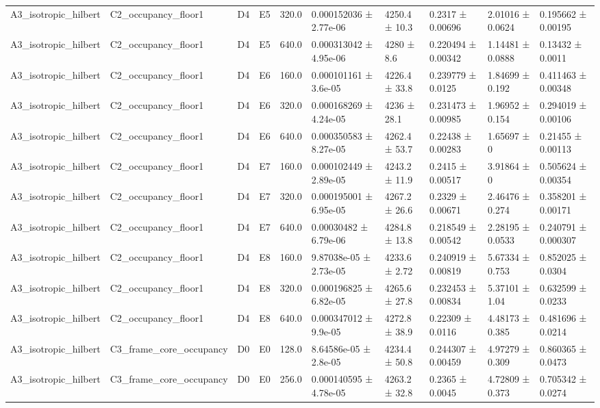 \begin{table}
\begin{tabular}{llllllllll}
A3\_isotropic\_hilbert & C2\_occupancy\_floor1 & D4 & E5 & 320.0 & 0.000152036 ± 2.77e-06 & 4250.4 ± 10.3 & 0.2317 ± 0.00696 & 2.01016 ± 0.0624 & 0.195662 ± 0.00195 \\
A3\_isotropic\_hilbert & C2\_occupancy\_floor1 & D4 & E5 & 640.0 & 0.000313042 ± 4.95e-06 & 4280 ± 8.6 & 0.220494 ± 0.00342 & 1.14481 ± 0.0888 & 0.13432 ± 0.0011 \\
A3\_isotropic\_hilbert & C2\_occupancy\_floor1 & D4 & E6 & 160.0 & 0.000101161 ± 3.6e-05 & 4226.4 ± 33.8 & 0.239779 ± 0.0125 & 1.84699 ± 0.192 & 0.411463 ± 0.00348 \\
A3\_isotropic\_hilbert & C2\_occupancy\_floor1 & D4 & E6 & 320.0 & 0.000168269 ± 4.24e-05 & 4236 ± 28.1 & 0.231473 ± 0.00985 & 1.96952 ± 0.154 & 0.294019 ± 0.00106 \\
A3\_isotropic\_hilbert & C2\_occupancy\_floor1 & D4 & E6 & 640.0 & 0.000350583 ± 8.27e-05 & 4262.4 ± 53.7 & 0.22438 ± 0.00283 & 1.65697 ± 0 & 0.21455 ± 0.00113 \\
A3\_isotropic\_hilbert & C2\_occupancy\_floor1 & D4 & E7 & 160.0 & 0.000102449 ± 2.89e-05 & 4243.2 ± 11.9 & 0.2415 ± 0.00517 & 3.91864 ± 0 & 0.505624 ± 0.00354 \\
A3\_isotropic\_hilbert & C2\_occupancy\_floor1 & D4 & E7 & 320.0 & 0.000195001 ± 6.95e-05 & 4267.2 ± 26.6 & 0.2329 ± 0.00671 & 2.46476 ± 0.274 & 0.358201 ± 0.00171 \\
A3\_isotropic\_hilbert & C2\_occupancy\_floor1 & D4 & E7 & 640.0 & 0.00030482 ± 6.79e-06 & 4284.8 ± 13.8 & 0.218549 ± 0.00542 & 2.28195 ± 0.0533 & 0.240791 ± 0.000307 \\
A3\_isotropic\_hilbert & C2\_occupancy\_floor1 & D4 & E8 & 160.0 & 9.87038e-05 ± 2.73e-05 & 4233.6 ± 2.72 & 0.240919 ± 0.00819 & 5.67334 ± 0.753 & 0.852025 ± 0.0304 \\
A3\_isotropic\_hilbert & C2\_occupancy\_floor1 & D4 & E8 & 320.0 & 0.000196825 ± 6.82e-05 & 4265.6 ± 27.8 & 0.232453 ± 0.00834 & 5.37101 ± 1.04 & 0.632599 ± 0.0233 \\
A3\_isotropic\_hilbert & C2\_occupancy\_floor1 & D4 & E8 & 640.0 & 0.000347012 ± 9.9e-05 & 4272.8 ± 38.9 & 0.22309 ± 0.0116 & 4.48173 ± 0.385 & 0.481696 ± 0.0214 \\
A3\_isotropic\_hilbert & C3\_frame\_core\_occupancy & D0 & E0 & 128.0 & 8.64586e-05 ± 2.8e-05 & 4234.4 ± 50.8 & 0.244307 ± 0.00459 & 4.97279 ± 0.309 & 0.860365 ± 0.0473 \\
A3\_isotropic\_hilbert & C3\_frame\_core\_occupancy & D0 & E0 & 256.0 & 0.000140595 ± 4.78e-05 & 4263.2 ± 32.8 & 0.2365 ± 0.0045 & 4.72809 ± 0.373 & 0.705342 ± 0.0274 \\

\end{tabular}
\end{table}
